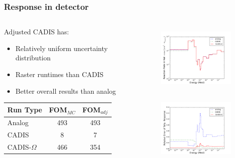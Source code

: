 \documentclass[handout]{beamer}
\renewcommand{\(}{\begin{columns}}
\renewcommand{\)}{\end{columns}}
\newcommand{\<}[1]{\begin{column}{#1}}
\renewcommand{\>}{\end{column}}
\begin{document}
%
\begin{frame}[fragile]
  \frametitle{Response in detector}
  
\begin{columns}
  \begin{column}{0.45\textwidth}
  Adjusted CADIS has:
  \begin{itemize}
    \item Relatively uniform uncertainty distribution
    \item Raster runtimes than CADIS
    \item Better overall results than analog
  \end{itemize}
  \begin{tabular}{|l|c c|}
  \hline
      Run Type & FOM$_{MC}$ & FOM$_{adj}$ \\  
      \hline
      Analog & 493 & 493 \\
      CADIS  & 8   &   7 \\
      CADIS-$\Omega$ & 466 & 354 \\
      \hline
  \end{tabular}
  \end{column}
  \begin{column}{0.55\textwidth}
  	\begin{figure}
  	\begin{center}
  		\includegraphics[height=1.3in,clip]{response.png}
	\end{center}
  	\end{figure}
  	  \begin{figure}
  	\begin{center}
  		\includegraphics[height=1.3in,clip]{response_RE.png}
	\end{center}
  	\end{figure}
  \end{column}
\end{columns}
	
\end{frame}
\end{document}
